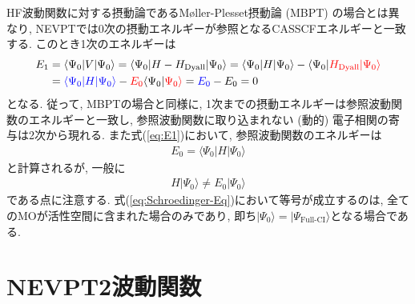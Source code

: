 \documentclass[11pt,pra,aps]{revtex4}
\newcommand{\red}[1]{\textcolor{red}{#1}}
\newcommand{\blue}[1]{\textcolor{blue}{#1}}
\begin{document}
HF波動関数に対する摂動論であるM\o ller-Plesset摂動論 (MBPT)\cite{MP2} の場合とは異なり, NEVPTでは0次の摂動エネルギーが参照となるCASSCFエネルギーと一致する. このとき1次のエネルギーは
\begin{align}
  E_1 &= \langle\Psi_0|V|\Psi_0\rangle=\langle\Psi_0|H-H_\text{Dyall}|\Psi_0\rangle=\langle\Psi_0|H|\Psi_0\rangle-\langle\Psi_0|\red{H_\text{Dyall}|\Psi_0\rangle} \nonumber \\
      &= \blue{\langle\Psi_0|H|\Psi_0\rangle}-\red{E_0}\langle\Psi_0|\red{\Psi_0\rangle} = \blue{E_0} - E_0 = 0 \label{eq:E1}
\end{align}
となる. 従って, MBPTの場合と同様に, 1次までの摂動エネルギーは参照波動関数のエネルギーと一致し, 参照波動関数に取り込まれない (動的) 電子相関の寄与は2次から現れる. また式(\ref{eq:E1})において, 参照波動関数のエネルギーは
\begin{align}
  E_0=\langle\Psi_0|H|\Psi_0\rangle
\end{align}
と計算されるが, 一般に
\begin{align}
  H|\Psi_0\rangle \neq E_0|\Psi_0\rangle \label{eq:Schroedinger-Eq}
\end{align}
である点に注意する. 式(\ref{eq:Schroedinger-Eq})において等号が成立するのは, 全てのMOが活性空間に含まれた場合のみであり, 即ち$|\Psi_0\rangle=|\Psi_\text{Full-CI}\rangle$となる場合である. 

\section{NEVPT2波動関数}
\end{document}
